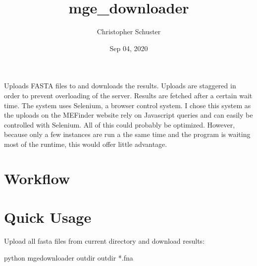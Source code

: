 \documentclass[letterpaper,10pt,english]{sphinxmanual}
\title{mge\_downloader}
\date{Sep 04, 2020}
\author{Christopher Schuster}
\begin{document}
\pagestyle{empty}
\sphinxmaketitle
\pagestyle{plain}
\sphinxtableofcontents
\pagestyle{normal}
\label{\detokenize{index::doc}}


Uploads FASTA files to  and downloads the results.
Uploads are staggered in order to prevent overloading of the server. Results are fetched after a certain
wait time. The system uses Selenium, a browser control system. I chose this system as the uploads on the
MEFinder website rely on Javascript queries and can easily be controlled with Selenium.
All of this could probably be optimized. However, because only a few instances are run a the same time
and the program is waiting most of the run\sphinxhyphen{}time, this would offer little advantage.



\chapter{Workflow}
\label{\detokenize{index:workflow}}


\chapter{Quick Usage}
\label{\detokenize{index:quick-usage}}
Upload all fasta files from current directory and download results:

\begin{sphinxVerbatim}[commandchars=\\\{\}]
\PYGZdl{} python mge\PYGZus{}downloader \PYGZhy{}\PYGZhy{}outdir outdir *.fna
\end{sphinxVerbatim}
\end{document}
